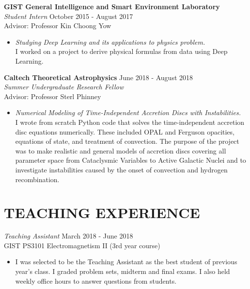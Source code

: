 \documentclass[margin, 10pt]{res} %
\begin{document}
\begin{resume}
{\bf GIST General Intelligence and Smart Environment Laboratory}\\
{\sl Student Intern} \hfill October 2015 - August 2017 \\
Advisor: Professor Kin Choong Yow
\begin{itemize}
\item[] {\sl Studying Deep Learning and its applications to physics problem.}\\
I worked on a project to derive physical formulas from data using Deep Learning.
\end{itemize} 

{\bf Caltech Theoretical Astrophysics} \hfill June 2018 - August 2018 \\
{\sl Summer Undergraduate Research Fellow} \\
Advisor: Professor Sterl Phinney
\begin{itemize}
\item[] {\sl Numerical Modeling of Time-Independent Accretion Discs with Instabilities.}\\
I wrote from scratch Python code that solves the time-independent accretion disc equations numerically. These included OPAL and Ferguson opacities, equations of state, and treatment of convection. The purpose of the project was to make realistic and general models of accretion discs covering all parameter space from Cataclysmic Variables to Active Galactic Nuclei and to investigate instabilities caused by the onset of convection and hydrogen recombination.
\end{itemize} 

\section{TEACHING EXPERIENCE}

{\sl Teaching Assistant} \hfill March 2018 - June 2018 \\
GIST PS3101 Electromagnetism II (3rd year course)
\begin{itemize} \itemsep -2pt %
\item[] I was selected to be the Teaching Assistant as the best student of previous year's class. I graded problem sets, midterm and final exams. I also held weekly office hours to answer questions from students.
\end{itemize}



\end{resume}
\end{document}
